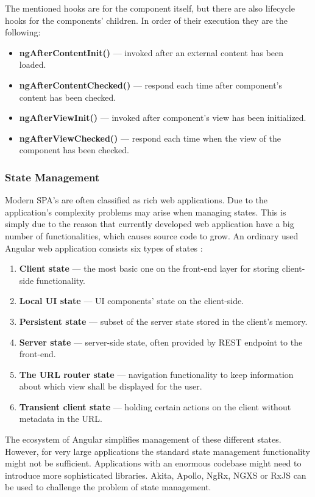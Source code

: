 \documentclass{article} %
\begin{document}
The mentioned hooks are for the component itself, but there are also lifecycle hooks for the components' children. In order of their execution they are the following:
\begin{itemize}
    \item \textbf{ngAfterContentInit()} --- invoked after an external content has been loaded.
    \item \textbf{ngAfterContentChecked()} --- respond each time after component's content has been checked.
    \item \textbf{ngAfterViewInit()} --- invoked after component's view has been initialized.
    \item \textbf{ngAfterViewChecked()} --- respond each time when the view of the component has been checked.
\end{itemize}
\subsubsection{State Management}
Modern SPA's are often classified as rich web applications. Due to the application's complexity problems may arise when managing states. This is simply due to the reason that currently developed web application have a big number of functionalities, which causes source code to grow. An ordinary used Angular web application consists six types of states \cite{bib:angular_states}:
\begin{enumerate}
    \item \textbf{Client state} --- the most basic one on the front-end layer for storing client-side functionality.
    \item \textbf{Local UI state} --- UI components' state on the client-side.
    \item \textbf{Persistent state} --- subset of the server state stored in the client's memory.
    \item \textbf{Server state} --- server-side state, often provided by REST endpoint to the front-end.
    \item \textbf{The URL router state} --- navigation functionality to keep information about which view shall be displayed for the user.
    \item \textbf{Transient client state} --- holding certain actions on the client without metadata in the URL.
\end{enumerate}
The ecosystem of Angular simplifies management of these different states. However, for very large applications the standard state management functionality might not be sufficient. Applications with an enormous codebase might need to introduce more sophisticated libraries. Akita, Apollo, NgRx, NGXS or RxJS can be used to challenge the problem of state management.
\end{document}
